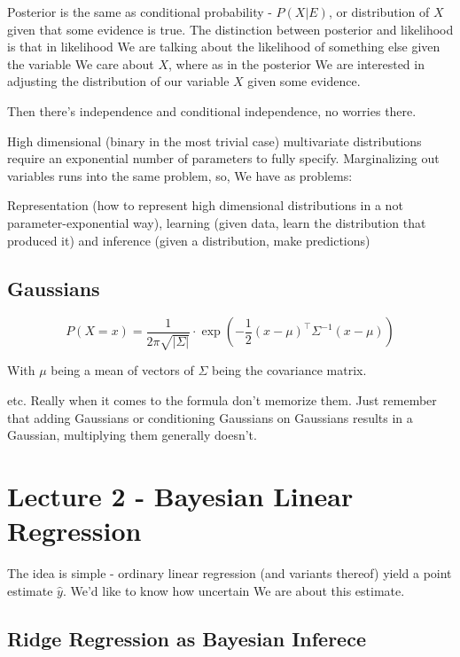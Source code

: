 \documentclass{article}
\begin{document}
		Posterior is the same as conditional probability - $P(X|E)$, or distribution of $X$ given that some evidence is true. The distinction between posterior and likelihood is that in likelihood We are talking about the likelihood of something else given the variable We care about $X$, where as in the posterior We are interested in adjusting the distribution of our variable $X$ given some evidence. 
		
		Then there's independence and conditional independence, no worries there.
		
		High dimensional (binary in the most trivial case) multivariate distributions require an exponential number of parameters to fully specify. Marginalizing out variables runs into the same problem, so, We have as problems:
		 
		 Representation (how to represent high dimensional distributions in a not parameter-exponential way), learning (given data, learn the distribution that produced it) and inference (given a distribution, make predictions)
		
	\subsection{Gaussians}
	
		\[ P(X=x) = \frac{1}{2\pi\sqrt{|\Sigma|}}\cdot\exp\left(-\frac{1}{2}(x-\mu)^\top\Sigma ^{-1} (x-\mu) \right) \] 
		
		With $\mu$ being a mean of vectors of $\Sigma$ being the covariance matrix.
		
		etc. Really when it comes to the formula don't memorize them. Just remember that adding Gaussians or conditioning Gaussians on Gaussians results in a Gaussian, multiplying them generally doesn't.
		
	
						

\section{Lecture 2 - Bayesian Linear Regression}

	The idea is simple - ordinary linear regression (and variants thereof) yield a point estimate $\hat{y}$. We'd like to know how uncertain We are about this estimate.
	
	\subsection{Ridge Regression as Bayesian Inferece}
	
\end{document}
